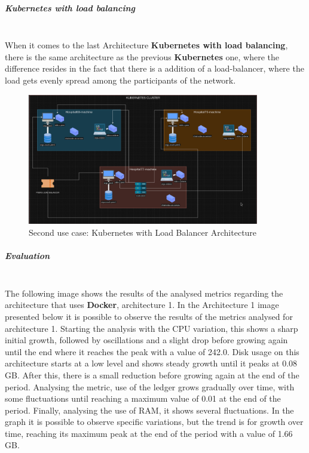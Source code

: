 \subparagraph{Kubernetes with load balancing} \mbox{}\\
When it comes to the last Architecture \textbf{Kubernetes with load balancing}, there is the same architecture as the previous \textbf{Kubernetes} one, where the difference resides in the fact that there is a addition of a load-balancer, where the load gets evenly spread among the participants of the network.
\begin{figure}[H]
	\centering
	\includegraphics[width=0.9\textwidth]{assets/use-case-2/k8-lb.png} %
	\caption{Second use case: Kubernetes with Load Balancer Architecture}
	\label{fig:sample-image} 
\end{figure}


\subparagraph{Evaluation} \mbox{}\\

The following image shows the results of the analysed metrics regarding the architecture that uses \textbf{Docker}, architecture 1.
In the Architecture 1 image presented below it is possible to observe the results of the metrics analysed for architecture 1. Starting the analysis with the CPU variation, this shows a sharp initial growth, followed by oscillations and a slight drop before growing again until the end where it reaches the peak with a value of 242.0.
Disk usage on this architecture starts at a low level and shows steady growth until it peaks at 0.08 GB. After this, there is a small reduction before growing again at the end of the period.
Analysing the metric, use of the ledger grows gradually over time, with some fluctuations until reaching a maximum value of 0.01 at the end of the period.
Finally, analysing the use of RAM, it shows several fluctuations. In the graph it is possible to observe specific variations, but the trend is for growth over time, reaching its maximum peak at the end of the period with a value of 1.66 GB.

